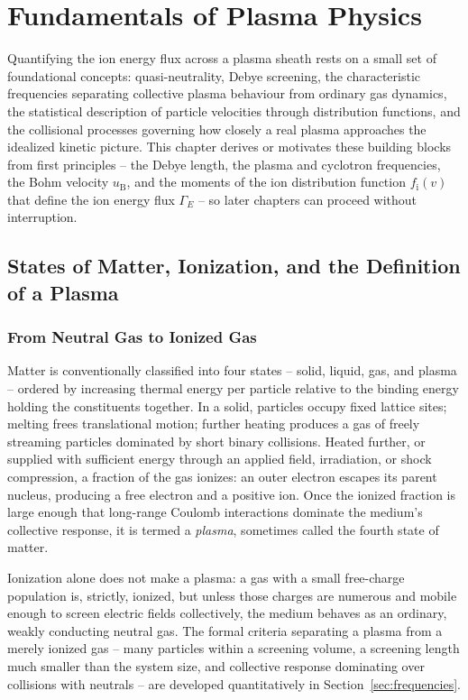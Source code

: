\chapter{Fundamentals of Plasma Physics}
\label{ch:fundamentals}

Quantifying the ion energy flux across a plasma sheath rests on a small set of foundational concepts: quasi-neutrality, Debye screening, the characteristic frequencies separating collective plasma behaviour from ordinary gas dynamics, the statistical description of particle velocities through distribution functions, and the collisional processes governing how closely a real plasma approaches the idealized kinetic picture. This chapter derives or motivates these building blocks from first principles -- the Debye length, the plasma and cyclotron frequencies, the Bohm velocity $u_{\mathrm{B}}$, and the moments of the ion distribution function $f_{\mathrm{i}}(v)$ that define the ion energy flux $\Gamma_{E}$ -- so later chapters can proceed without interruption.

\section{States of Matter, Ionization, and the Definition of a Plasma}
\label{sec:states-ionization}

\subsection{From Neutral Gas to Ionized Gas}

Matter is conventionally classified into four states -- solid, liquid, gas, and plasma -- ordered by increasing thermal energy per particle relative to the binding energy holding the constituents together. In a solid, particles occupy fixed lattice sites; melting frees translational motion; further heating produces a gas of freely streaming particles dominated by short binary collisions. Heated further, or supplied with sufficient energy through an applied field, irradiation, or shock compression, a fraction of the gas ionizes: an outer electron escapes its parent nucleus, producing a free electron and a positive ion. Once the ionized fraction is large enough that long-range Coulomb interactions dominate the medium's collective response, it is termed a \emph{plasma}, sometimes called the fourth state of matter.

Ionization alone does not make a plasma: a gas with a small free-charge population is, strictly, ionized, but unless those charges are numerous and mobile enough to screen electric fields collectively, the medium behaves as an ordinary, weakly conducting neutral gas. The formal criteria separating a plasma from a merely ionized gas -- many particles within a screening volume, a screening length much smaller than the system size, and collective response dominating over collisions with neutrals -- are developed quantitatively in Section~\ref{sec:frequencies}.

